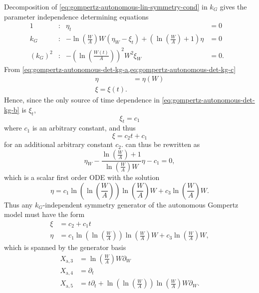 Decomposition of \cref{eq:gompertz-autonomous-lin-symmetry-cond} in \(k_G\) gives the parameter independence determining equations
\begin{subequations}
  \begin{flalign}
    1 & : & \eta_t &= 0 &\label{eq:gompertz-autonomous-det-kg-a}\\
    k_G & : & -\ln(\frac{W}{A}) W\left(\eta_W - \xi_t\right) + \left(\ln(\frac{W}{A}) + 1\right) \eta &= 0 &\label{eq:gompertz-autonomous-det-kg-b}\\
    (k_G)^2 & : & -\left(\ln(\frac{W(t)}{A})\right)^2 W^2 \xi_W &= 0. &\label{eq:gompertz-autonomous-det-kg-c}
  \end{flalign}
\end{subequations}
From \cref{eq:gompertz-autonomous-det-kg-a,eq:gompertz-autonomous-det-kg-c}
\begin{align*}
  \eta &= \eta(W) \\
  \xi = \xi(t).
\end{align*}
Hence, since the only source of time dependence in \cref{eq:gompertz-autonomous-det-kg-b} is \(\xi_t\),
\begin{equation*}
  \xi_t = c_1
\end{equation*}
where \(c_1\) is an arbitrary constant, and thus
\begin{equation*}
  \xi = c_2 t + c_1
\end{equation*}
for an additional arbitrary constant \(c_2\).
 can thus be rewritten as
\begin{equation*}
  \eta_W - \frac{\ln(\frac{W}{A}) + 1}{\ln(\frac{W}{A}) W} \eta - c_1 = 0,
\end{equation*}
which is a scalar first order ODE with the solution
\begin{equation*}
  \eta = c_1 \ln(\ln(\frac{W}{A})) \ln(\frac{W}{A}) W + c_3 \ln(\frac{W}{A}) W.
\end{equation*}
Thus any \(k_G\)-independent symmetry generator of the autonomous Gompertz model  must have the form
\begin{align*}
  \xi &= c_2 + c_1 t \\
  \eta &= c_1 \ln(\ln(\frac{W}{A})) \ln(\frac{W}{A}) W + c_3 \ln(\frac{W}{A}) W,
\end{align*}
which is spanned by the generator basis
\begin{align*}
  X_{\text{a},3} &= \ln(\frac{W}{A}) W \partial_W \\
  X_{\text{a},4} &= \partial_t \\
  X_{\text{a},5} &= t \partial_t + \ln(\ln(\frac{W}{A})) \ln(\frac{W}{A}) W \partial_W.
\end{align*}

